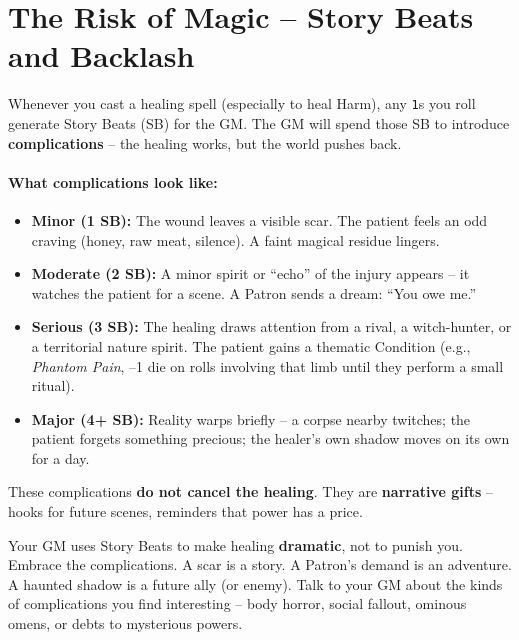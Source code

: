 \section{The Risk of Magic -- Story Beats and Backlash}
\label{sec:magic-healing-risk}

Whenever you cast a healing spell (especially to heal Harm), any \texttt{1}s you roll generate Story Beats (SB) for the GM. The GM will spend those SB to introduce \textbf{complications} -- the healing works, but the world pushes back.

\paragraph{What complications look like:}
\begin{itemize}
  \item \textbf{Minor (1 SB):} The wound leaves a visible scar. The patient feels an odd craving (honey, raw meat, silence). A faint magical residue lingers.
  \item \textbf{Moderate (2 SB):} A minor spirit or ``echo'' of the injury appears -- it watches the patient for a scene. A Patron sends a dream: ``You owe me.''
  \item \textbf{Serious (3 SB):} The healing draws attention from a rival, a witch-hunter, or a territorial nature spirit. The patient gains a thematic Condition (e.g., \textit{Phantom Pain}, --1 die on rolls involving that limb until they perform a small ritual).
  \item \textbf{Major (4+ SB):} Reality warps briefly -- a corpse nearby twitches; the patient forgets something precious; the healer's own shadow moves on its own for a day.
\end{itemize}

These complications \textbf{do not cancel the healing}. They are \textbf{narrative gifts} -- hooks for future scenes, reminders that power has a price.

\begin{tcolorbox}[colback=black!5!white,colframe=black!50!white, title=GM's Role,breakable]
Your GM uses Story Beats to make healing \textbf{dramatic}, not to punish you. Embrace the complications. A scar is a story. A Patron's demand is an adventure. A haunted shadow is a future ally (or enemy). Talk to your GM about the kinds of complications you find interesting -- body horror, social fallout, ominous omens, or debts to mysterious powers.
\end{tcolorbox}


